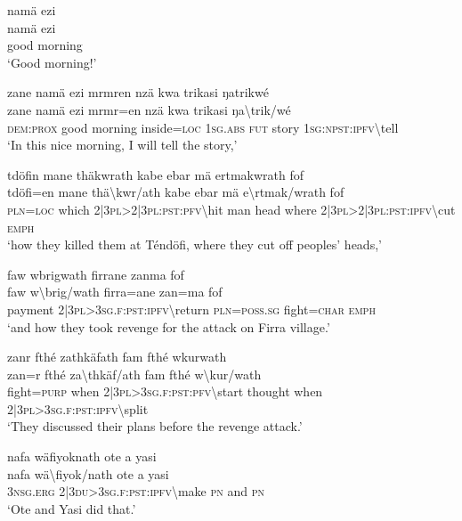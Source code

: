 \ea\label{ex:5:a1428}
namä ezi\\
\gll namä	ezi\\
     good	morning\\
\glt `Good morning!'
\z

\ea\label{ex:5:a1429}
zane namä ezi mrmren nzä kwa trikasi ŋatrikwé\\
\gll zane	namä	ezi	mrmr=en	nzä	kwa	trikasi	ŋa{\textbackslash}trik/wé\\
     \textsc{dem}:\textsc{prox}	good	morning	inside=\textsc{loc}	1\textsc{sg}.\textsc{abs}	\textsc{fut}	story	1\textsc{sg}:\textsc{npst}:\textsc{ipfv}{\textbackslash}tell\\
\glt `In this nice morning, I will tell the story,'
\z

\ea\label{ex:5:a1431}
tdöfin mane thäkwrath kabe ebar mä ertmakwrath fof\\
\gll tdöfi=en	mane	thä{\textbackslash}kwr/ath	kabe	ebar	mä	e{\textbackslash}rtmak/wrath	fof\\
     \textsc{pln}=\textsc{loc}	which	2|3\textsc{pl}>2|3\textsc{pl}:\textsc{pst}:\textsc{pfv}{\textbackslash}hit	man	head	where	2|3\textsc{pl}>2|3\textsc{pl}:\textsc{pst}:\textsc{ipfv}{\textbackslash}cut	\textsc{emph}\\
\glt `how they killed them at Téndöfi, where they cut off peoples' heads,'
\z

\ea\label{ex:5:a1432}
faw wbrigwath firrane zanma fof\\
\gll faw	w{\textbackslash}brig/wath	firra=ane	zan=ma	fof\\
     payment	2|3\textsc{pl}>3\textsc{sg}.\textsc{f}:\textsc{pst}:\textsc{ipfv}{\textbackslash}return	\textsc{pln}=\textsc{poss}.\textsc{sg}	fight=\textsc{char}	\textsc{emph}\\
\glt `and how they took revenge for the attack on Firra village.'
\z

\ea\label{ex:5:a1434}
zanr fthé zathkäfath fam fthé wkurwath\\
\gll zan=r	fthé	za{\textbackslash}thkäf/ath	fam	fthé	w{\textbackslash}kur/wath\\
     fight=\textsc{purp}	when	2|3\textsc{pl}>3\textsc{sg}.\textsc{f}:\textsc{pst}:\textsc{pfv}{\textbackslash}start	thought	when	2|3\textsc{pl}>3\textsc{sg}.\textsc{f}:\textsc{pst}:\textsc{ipfv}{\textbackslash}split\\
\glt `They discussed their plans before the revenge attack.'
\z

\ea\label{ex:5:a1435}
nafa wäfiyoknath ote a yasi\\
\gll nafa	wä{\textbackslash}fiyok/nath	ote	a	yasi\\
     3\textsc{nsg}.\textsc{erg}	2|3\textsc{du}>3\textsc{sg}.\textsc{f}:\textsc{pst}:\textsc{ipfv}{\textbackslash}make	\textsc{pn}	and	\textsc{pn}\\
\glt `Ote and Yasi did that.'
\z

